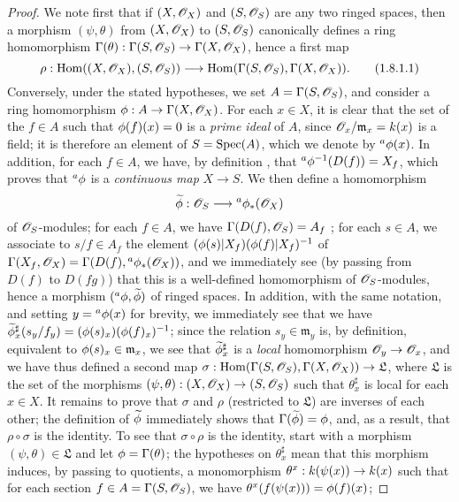 \begin{proof}
We note first that if $(X,\mathscr{O}_X)$ and $(S,\mathscr{O}_S)$ are any two ringed spaces, then a morphism $(\psi,\theta)$ from $(X,\mathscr{O}_X)$ to $(S,\mathscr{O}_S)$ canonically defines a ring homomorphism $\Gamma(\theta):\Gamma(S,\sh{O}_S)\to\Gamma(X,\sh{O}_X)$, hence a first map
\[
  \label{I.1.8.1.1}
  \rho:\Hom((X,\sh{O}_X),(S,\sh{O}_S))\to\Hom(\Gamma(S,\sh{O}_S),\Gamma(X,\sh{O}_X)).
  \tag{1.8.1.1}
\]
Conversely, under the stated hypotheses, we set $A=\Gamma(S,\mathscr{O}_S)$, and consider a ring homomorphism $\vphi:A\to\Gamma(X,\sh{O}_X)$.
For each $x\in X$, it is clear that the set of the $f\in A$ such that $\phi(f)(x)=0$ is a \emph{prime ideal} of $A$, since $\mathscr{O}_x/\mathfrak{m}_x=k(x)$ is a field;
it is therefore an element of $S=\operatorname{Spec}(A)$, which we denote by ${}^a\phi(x)$.
  In addition, for each $f\in A$, we have, by definition , that ${}^a\phi^{-1}(D(f))=X_f$, which proves that ${}^a\phi$ is a \emph{continuous map} $X\to S$.
We then define a homomorphism
\[
  \widetilde{\vphi}:\sh{O}_S\to{}^a\vphi_*(\sh{O}_X)
\]
of $\mathscr{O}_S$-modules;
for each $f\in A$, we have $\Gamma(D(f),\mathscr{O}_S)=A_f$ ;
for each $s\in A$, we associate to $s/f\in A_f$ the element $(\phi(s)|X_f)(\phi(f)|X_f)^{-1}$ of $\Gamma(X_f,\mathscr{O}_X)=\Gamma(D(f),{}^a\phi_*(\mathscr{O}_X))$, and we immediately see (by passing from $D(f)$ to $D(fg)$) that this is a well-defined homomorphism of $\mathscr{O}_S$-modules, hence a morphism $({}^a\phi,\widetilde{\phi})$ of ringed spaces.
In addition, with the same notation, and setting $y={}^a\phi(x)$ for brevity, we immediately see  that we have $\widetilde{\phi}_x^\sharp(s_y/f_y)=(\phi(s)_x)(\phi(f)_x)^{-1}$;
since the relation $s_y\in\mathfrak{m}_y$ is, by definition, equivalent to $\phi(s)_x\in\mathfrak{m}_x$, we see that $\widetilde{\phi}_x^\sharp$ is a \emph{local} homomorphism $\sh{O}_y\to\sh{O}_x$, and we have thus defined a second map $\sigma:\Hom(\Gamma(S,\sh{O}_S),\Gamma(X,\sh{O}_X))\to\mathfrak{L}$, where $\mathfrak{L}$ is the set of the morphisms $(\psi,\theta):(X,\sh{O}_X)\to(S,\sh{O}_S)$ such that $\theta_x^\sharp$ is local for each $x\in X$.
It remains to prove that $\sigma$ and $\rho$ (restricted to $\mathfrak{L}$) are inverses of each other;
the definition of $\widetilde{\phi}$ immediately shows that $\Gamma(\widetilde{\phi})=\phi$, and, as a result, that $\rho\circ\sigma$ is the identity.
To see that $\sigma\circ\rho$ is the identity, start with a morphism $(\psi,\theta)\in\mathfrak{L}$ and let $\phi=\Gamma(\theta)$;
the hypotheses on $\theta_x^\sharp$ mean that this morphism induces, by passing to quotients, a monomorphism $\theta^x:\kres(\psi(x))\to\kres(x)$ such that for each section $f\in A=\Gamma(S,\mathscr{O}_S)$, we have $\theta^x(f(\psi(x)))=\phi(f)(x)$;

\end{proof}
